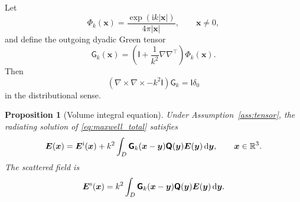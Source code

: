 \documentclass[11pt]{article}
\numberwithin{equation}{section}
\newcommand{\R}{\mathbb{R}}
\newcommand{\ii}{\mathrm{i}}
\newcommand{\dd}{\,\mathrm d}
\newcommand{\curl}{\nabla\times}
\newcommand{\vect}[1]{\bm{#1}}
\newcommand{\tens}[1]{\bm{\mathsf{#1}}}
\newcommand{\Id}{\ensuremath{\tens{I}}}
\newcommand{\G}{\ensuremath{\tens{G}}}
\newcommand{\Qt}{\ensuremath{\tens{Q}}}
\newcommand{\abs}[1]{\left\lvert #1\right\rvert}
\theoremstyle{plain}
\newtheorem{proposition}[theorem]{Proposition}
\theoremstyle{definition}
\begin{document}
Let
\begin{equation*}
  \Phi_k(\vect{x})=\frac{\exp(\ii k\abs{\vect{x}})}{4\pi\abs{\vect{x}}},\qquad \vect{x}\ne0,
\end{equation*}
and define the outgoing dyadic Green tensor
\begin{equation*}
  \G_k(\vect{x})=\left(\Id+\frac{1}{k^2}\nabla\nabla^\top\right)\Phi_k(\vect{x}).
\end{equation*}
Then
\begin{equation*}
  (\curl\curl-k^2\Id)\G_k=\Id\delta_0
\end{equation*}
in the distributional sense.

\begin{proposition}[Volume integral equation]\label{prop:LS}
Under Assumption~\ref{ass:tensor}, the radiating solution of \eqref{eq:maxwell_total} satisfies
\begin{equation*}
  \vect{E}(\vect{x})=\vect{E}^{\rm i}(\vect{x})+k^2\int_D\G_k(\vect{x}-\vect{y})\Qt(\vect{y})\vect{E}(\vect{y})\dd \vect{y},
  \qquad \vect{x}\in\R^3.
\end{equation*}
The scattered field is
\begin{equation*}
  \vect{E}^{\rm s}(\vect{x})=k^2\int_D\G_k(\vect{x}-\vect{y})\Qt(\vect{y})\vect{E}(\vect{y})\dd \vect{y}.
\end{equation*}
\end{proposition}
\end{document}
